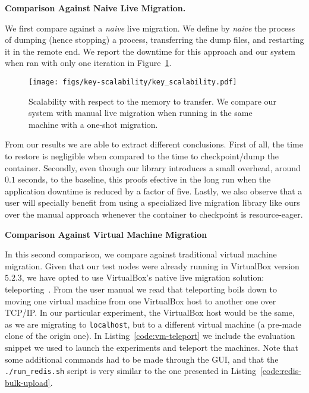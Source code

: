 \textbf{Comparison Against Naive Live Migration.}

We first compare against a \textit{naive} live migration.
We define by \textit{naive} the process of dumping (hence stopping) a process, transferring the dump files, and restarting it in the remote end.
We report the downtime for this approach and our system when ran with only one iteration in Figure~\ref{fig:key-scalability}.
\begin{figure}[h!]
    \centering
    \texttt{[image: figs/key-scalability/key\_scalability.pdf]}
    \caption[Scalability with respect to the memory to transfer.]{Scalability with respect to the memory to transfer. We compare our system with manual live migration when running in the same machine with a one-shot migration.\label{fig:key-scalability}}
\end{figure}

From our results we are able to extract different conclusions.
First of all, the time to restore is negligible when compared to the time to checkpoint/dump the container.
Secondly, even though our library introduces a small overhead, around $0.1$ seconds, to the baseline, this proofs efective in the long run when the application downtime is reduced by a factor of five.
Lastly, we also observe that a user will specially benefit from using a specialized live migration library like ours over the manual approach whenever the container to checkpoint is resource-eager.

\textbf{Comparison Against Virtual Machine Migration}

In this second comparison, we compare against traditional virtual machine migration.
Given that our test nodes were already running in VirtualBox version $5.2.3$, we have opted to use VirtualBox's native live migration solution: teleporting~\cite{vbox-teleport}.
From the user manual we read that teleporting boils down to moving one virtual machine from one VirtualBox host to another one over TCP/IP.
In our particular experiment, the VirtualBox  host would be the same, as we are migrating to \texttt{localhost}, but to a different virtual machine (a pre-made clone of the origin one).
In Listing~\ref{code:vm-teleport} we include the evaluation snippet we used to launch the experiments and teleport the machines.
Note that some additional commands had to be made through the GUI, and that the \texttt{./run\_redis.sh} script is very similar to the one presented in Listing~\ref{code:redis-bulk-upload}.

